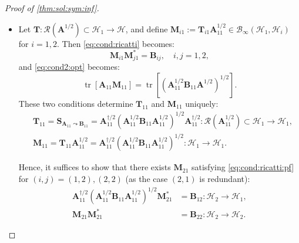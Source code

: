 \documentclass[10pt,a4paper]{amsart}
\DeclareMathOperator*{\tr}{tr}
\newcommand{\m}[1]{\mathbf{#1}} %
\renewcommand{\c}[1]{\mathcal{#1}} %
\begin{document}
\begin{proof}[Proof of \cref{thm:sol:sym:inf}]
\begin{itemize}[leftmargin = *]
\item [($\Leftarrow$)] 
Let $\m{T}: \c{R}(\m{A}^{1/2}) \subset \c{H}_{1} \rightarrow \c{H}$, and define $\m{M}_{i1} := \m{T}_{i1} \m{A}_{11}^{1/2} \in \c{B}_{\infty}(\c{H}_{1}, \c{H}_{i})$ for $i=1, 2$. Then \eqref{eq:cond:ricatti} becomes: 
\begin{equation}\label{eq:cond:ricatti:pf}
    \m{M}_{i1} \m{M}_{j1}^{*} = \m{B}_{ij}, \quad i, j = 1, 2,
\end{equation}
and \eqref{eq:cond2:opt} becomes:
\begin{equation*}
    \tr[ \m{A}_{11} \m{M}_{11}] = \tr [(\m{A}_{11}^{1/2} \m{B}_{11} \m{A}^{1/2})^{1/2}].
\end{equation*}
These two conditions determine $\m{T}_{11}$ and $\m{M}_{11}$ uniquely:
\begin{align*}
    &\m{T}_{11} = \m{S}_{\m{A}_{11} \leadsto \m{B}_{11}} = \m{A}_{11}^{\dagger/2} (\m{A}_{11}^{1/2} \m{B}_{11} \m{A}_{11}^{1/2})^{1/2} \m{A}_{11}^{\dagger/2}: \c{R}(\m{A}_{11}^{1/2}) \subset \c{H}_{1} \rightarrow \c{H}_{1}, \\
    &\m{M}_{11} = \m{T}_{11} \m{A}_{11}^{1/2} = \m{A}_{11}^{\dagger/2} (\m{A}_{11}^{1/2} \m{B}_{11} \m{A}_{11}^{1/2})^{1/2} : \c{H}_{1} \rightarrow \c{H}_{1}.
\end{align*}

Hence, it suffices to show that there exists $\m{M}_{21}$ satisfying \eqref{eq:cond:ricatti:pf} for $(i, j) =(1, 2), (2, 2)$ (as the case $(2, 1)$ is redundant):
\begin{align}
    \m{A}_{11}^{\dagger/2} (\m{A}_{11}^{1/2} \m{B}_{11} \m{A}_{11}^{1/2})^{1/2} \m{M}_{21}^{*} &= \m{B}_{12}: \c{H}_{2} \rightarrow \c{H}_{1}, \label{eq:cond:ricatti:pf1} \\
    \m{M}_{21} \m{M}_{21}^{*} &= \m{B}_{22}: \c{H}_{2} \rightarrow \c{H}_{2}. \label{eq:cond:ricatti:pf2}
\end{align}


\end{itemize}
\end{proof}
\end{document}

